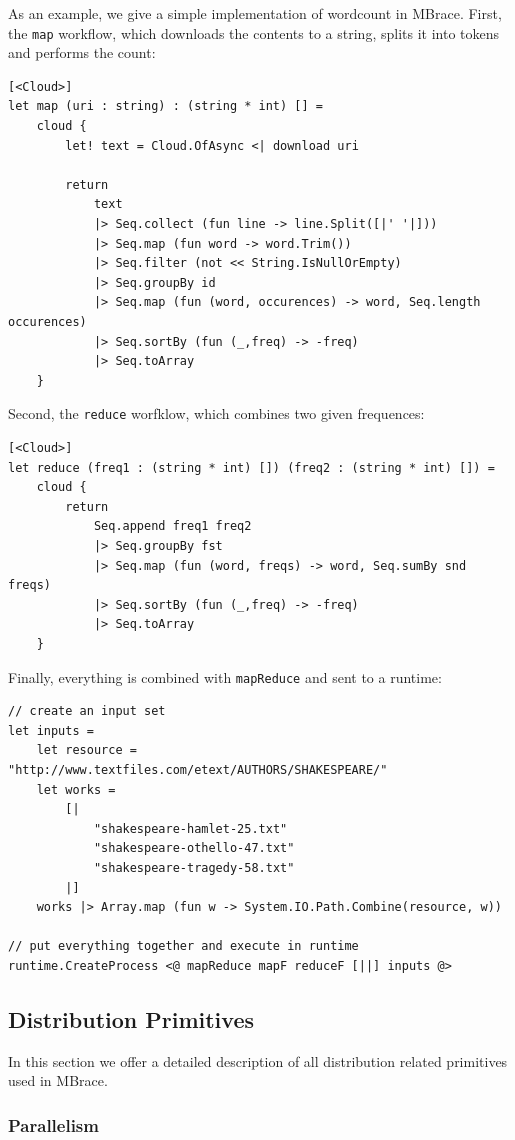 \documentclass[9pt,a4paper]{article}
\newcommand{\mbrace}{MBrace}
\begin{document}
As an example, we give a simple implementation of wordcount in \mbrace{}.
First, the \texttt{map} workflow, which downloads the contents to a string,
splits it into tokens and performs the count:
\begin{lstlisting}
[<Cloud>]
let map (uri : string) : (string * int) [] =
    cloud {
        let! text = Cloud.OfAsync <| download uri

        return
            text
            |> Seq.collect (fun line -> line.Split([|' '|]))
            |> Seq.map (fun word -> word.Trim())
            |> Seq.filter (not << String.IsNullOrEmpty)
            |> Seq.groupBy id
            |> Seq.map (fun (word, occurences) -> word, Seq.length occurences)
            |> Seq.sortBy (fun (_,freq) -> -freq)
            |> Seq.toArray
    }
\end{lstlisting}
Second, the \texttt{reduce} worfklow, which combines two given frequences:
\begin{lstlisting}
[<Cloud>]
let reduce (freq1 : (string * int) []) (freq2 : (string * int) []) =
    cloud {
        return
            Seq.append freq1 freq2
            |> Seq.groupBy fst
            |> Seq.map (fun (word, freqs) -> word, Seq.sumBy snd freqs)
            |> Seq.sortBy (fun (_,freq) -> -freq)
            |> Seq.toArray
    }
\end{lstlisting}
Finally, everything is combined with \texttt{mapReduce} and sent to a runtime:
\begin{lstlisting}
// create an input set
let inputs =
    let resource = "http://www.textfiles.com/etext/AUTHORS/SHAKESPEARE/"
    let works =
        [|
            "shakespeare-hamlet-25.txt"
            "shakespeare-othello-47.txt"
            "shakespeare-tragedy-58.txt"
        |]
    works |> Array.map (fun w -> System.IO.Path.Combine(resource, w))
    
// put everything together and execute in runtime
runtime.CreateProcess <@ mapReduce mapF reduceF [||] inputs @>
\end{lstlisting}

\subsection{Distribution Primitives}

In this section we offer a detailed description of all distribution related
primitives used in \mbrace{}.

\subsubsection*{Parallelism}
\end{document}
